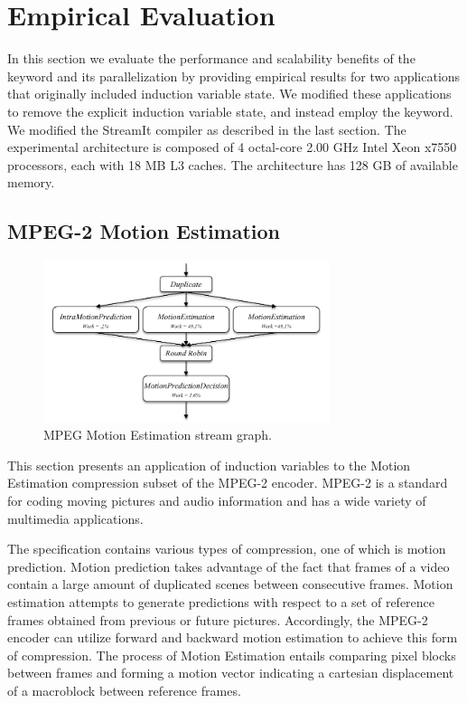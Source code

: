 \section{Empirical Evaluation}
\label{sec:analysis}

In this section we evaluate the performance and scalability benefits
of the \iter keyword and its parallelization by providing empirical
results for two applications that originally included induction
variable state. We modified these applications to remove the explicit
induction variable state, and instead employ the \iter keyword. We
modified the StreamIt compiler as described in the last section.  The
experimental architecture is composed of 4 octal-core 2.00 GHz Intel
Xeon x7550 processors, each with 18 MB L3 caches. The architecture has
128 GB of available memory.

\subsection{MPEG-2 Motion Estimation}
\label{sec:mpeg}

\begin{figure}[t]
\includegraphics[width=3.3in]{figures/work_estimate_mpeg_motionestimation.pdf}
\caption{MPEG Motion Estimation stream graph.\protect\label{fig:mpegMEgraph}}
\end{figure}


This section presents an application of induction variables to the Motion Estimation compression subset of the MPEG-2 encoder.  MPEG-2 is a standard for coding moving pictures and audio information and has a wide variety of multimedia applications.  

The specification contains various types of compression, one of which is motion prediction.  Motion prediction takes advantage of the fact that frames of a video contain a large amount of duplicated scenes between consecutive frames.  Motion estimation attempts to generate predictions with respect to a set of reference frames obtained from previous or future pictures.  Accordingly, the MPEG-2 encoder can utilize forward and backward motion estimation to achieve this form of compression.  The process of Motion Estimation entails comparing pixel blocks between frames and forming a motion vector indicating a cartesian displacement of a macroblock between reference frames.  


